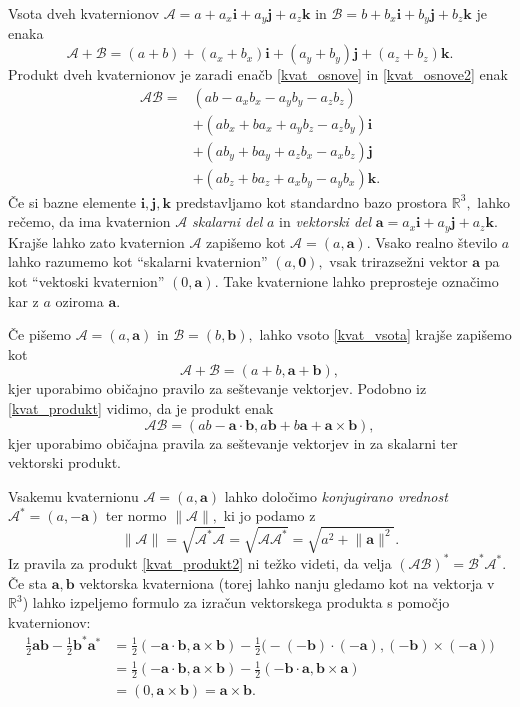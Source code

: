 \documentclass[12pt,a4paper,twoside]{article}
\theoremstyle{definition} %
\theoremstyle{plain} %
\theoremstyle{primerstyle}
\numberwithin{equation}{section}  %
\newcommand{\R}{\mathbb R}
\newcommand{\aV}{\mathbf{a}}
\newcommand{\bV}{\mathbf{b}}
\newcommand{\iV}{\mathbf{i}}
\newcommand{\jV}{\mathbf{j}}
\newcommand{\kV}{\mathbf{k}}
\newcommand{\AQ}{\mathcal{A}}
\newcommand{\BQ}{\mathcal{B}}
\begin{document}
Vsota dveh kvaternionov $\AQ=a+a_x\iV+a_y\jV+a_z\kV$ in $\BQ=b+b_x\iV+b_y\jV+b_z\kV$ je enaka
\begin{equation}
	\label{kvat_vsota}
	\AQ+\BQ=(a+b)+(a_x+b_x)\iV+(a_y+b_y)\jV+(a_z+b_z)\kV.
\end{equation}
Produkt dveh kvaternionov je zaradi enačb \eqref{kvat_osnove} in \eqref{kvat_osnove2} enak
\begin{align}
	\AQ\BQ=&(ab-a_xb_x-a_yb_y-a_zb_z)\nonumber\\
	&+(ab_x+ba_x+a_yb_z-a_zb_y)\iV\label{kvat_produkt}\\
	&+(ab_y+ba_y+a_zb_x-a_xb_z)\jV\nonumber\\
	&+(ab_z+ba_z+a_xb_y-a_yb_x)\kV.\nonumber
\end{align}
Če si bazne elemente $\iV,\jV,\kV$ predstavljamo kot standardno bazo prostora $\R^3,$ lahko rečemo, da ima kvaternion $\AQ$ \emph{skalarni del} $a$ in \emph{vektorski del} $\aV=a_x\iV+a_y\jV+a_z\kV.$ Krajše lahko zato kvaternion $\AQ$ zapišemo kot $\AQ=(a,\aV).$ Vsako realno število $a$ lahko razumemo kot ``skalarni kvaternion'' $(a,\mathbf{0}),$ vsak trirazsežni vektor $\aV$ pa kot ``vektoski kvaternion'' $(0,\aV).$ Take kvaternione lahko preprosteje označimo kar z $a$ oziroma $\aV.$

Če pišemo $\AQ=(a,\aV)$ in $\BQ=(b,\bV),$ lahko vsoto \eqref{kvat_vsota} krajše zapišemo kot
\begin{equation}
	\label{kvat_vsota2}
	\AQ+\BQ=(a+b,\aV+\bV),
\end{equation}
kjer uporabimo običajno pravilo za seštevanje vektorjev. Podobno iz \eqref{kvat_produkt} vidimo, da je produkt enak
\begin{equation}
	\label{kvat_produkt2}
	\AQ\BQ=(ab-\aV\cdot\bV,a\bV+b\aV+\aV\times\bV),
\end{equation}
kjer uporabimo običajna pravila za seštevanje vektorjev in za skalarni ter vektorski produkt.

Vsakemu kvaternionu $\AQ=(a,\aV)$ lahko določimo \emph{konjugirano vrednost} $\AQ^*=(a,-\aV)$ ter normo $\lVert\AQ\rVert,$ ki jo podamo z
\begin{equation}
	\label{kvat_norma}
	\lVert\AQ\rVert=\sqrt{\AQ^*\AQ}=\sqrt{\AQ\AQ^*}=\sqrt{a^2+\lVert\aV\rVert^2}.
\end{equation}
Iz pravila za produkt \eqref{kvat_produkt2} ni težko videti, da velja $(\AQ\BQ)^*=\BQ^*\AQ^*.$ Če sta $\aV,\bV$ vektorska kvaterniona (torej lahko nanju gledamo kot na vektorja v $\R^3$) lahko izpeljemo formulo za izračun vektorskega produkta s pomočjo kvaternionov:
\begin{align}
	\frac{1}{2}\aV\bV-\frac{1}{2}\bV^*\aV^*&=\frac{1}{2}(-\aV\cdot\bV,\aV\times\bV)-\frac{1}{2}\big(-(-\bV)\cdot(-\aV),(-\bV)\times(-\aV)\big)\nonumber\\
	&=\frac{1}{2}(-\aV\cdot\bV,\aV\times\bV)-\frac{1}{2}(-\bV\cdot\aV,\bV\times\aV)\label{kvat_vekt_prod}\\
	&=(0,\aV\times\bV)=\aV\times\bV.\nonumber
\end{align}
\end{document}
